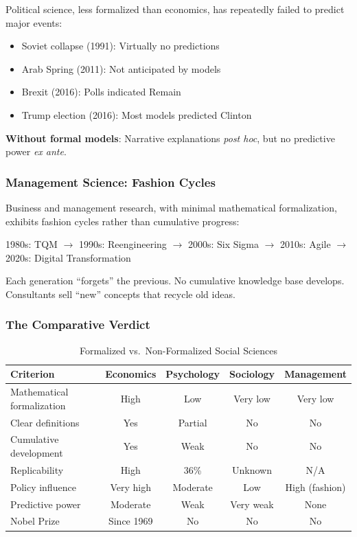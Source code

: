 Political science, less formalized than economics, has repeatedly failed to
predict major events:
\begin{itemize}[nosep]
    \item Soviet collapse (1991): Virtually no predictions
    \item Arab Spring (2011): Not anticipated by models
    \item Brexit (2016): Polls indicated Remain
    \item Trump election (2016): Most models predicted Clinton
\end{itemize}

\textbf{Without formal models}: Narrative explanations \textit{post hoc},
but no predictive power \textit{ex ante}.

\subsubsection{Management Science: Fashion Cycles}

Business and management research, with minimal mathematical formalization,
exhibits fashion cycles rather than cumulative progress:
\begin{center}
1980s: TQM $\to$ 1990s: Reengineering $\to$ 2000s: Six Sigma $\to$
2010s: Agile $\to$ 2020s: Digital Transformation
\end{center}

Each generation ``forgets'' the previous. No cumulative knowledge base develops.
Consultants sell ``new'' concepts that recycle old ideas.

\subsubsection{The Comparative Verdict}

\begin{table}[htbp]
\centering
\caption{Formalized vs.\ Non-Formalized Social Sciences}
\label{tab:comparative}
\renewcommand{\arraystretch}{1.3}
\small
\begin{tabular}{@{}lcccc@{}}
\toprule
\textbf{Criterion} & \textbf{Economics} & \textbf{Psychology} & \textbf{Sociology} & \textbf{Management} \\
\midrule
Mathematical formalization & High & Low & Very low & Very low \\
Clear definitions & Yes & Partial & No & No \\
Cumulative development & Yes & Weak & No & No \\
Replicability & High & 36\% & Unknown & N/A \\
Policy influence & Very high & Moderate & Low & High (fashion) \\
Predictive power & Moderate & Weak & Very weak & None \\
Nobel Prize & Since 1969 & No & No & No \\
\bottomrule
\end{tabular}
\end{table}

